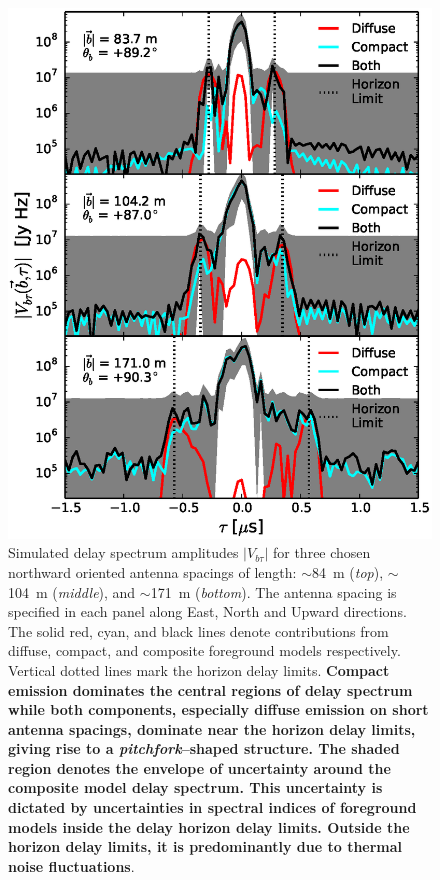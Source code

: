 \documentclass[preprint2,iop,numberedappendix]{emulateapj}
\begin{document}
\begin{figure}[htb]
\centering
\includegraphics[width=\linewidth]{f10.eps}
\caption{Simulated delay spectrum amplitudes $|V_{b\tau}|$ for three chosen northward oriented antenna spacings of length: $\sim$84~m ({\it top}), $\sim$104~m ({\it middle}), and $\sim$171~m ({\it bottom}). The antenna spacing is specified in each panel along East, North and Upward directions. The solid red, cyan, and black lines denote contributions from diffuse, compact, and composite foreground models respectively. Vertical dotted lines mark the horizon delay limits. {\bf Compact emission dominates the central regions of delay spectrum while both components, especially diffuse emission on short antenna spacings, dominate near the horizon delay limits, giving rise to a {\it pitchfork}--shaped structure. The shaded region denotes the envelope of uncertainty around the composite model delay spectrum. This uncertainty is dictated by uncertainties in spectral indices of foreground models inside the delay horizon delay limits. Outside the horizon delay limits, it is predominantly due to thermal noise fluctuations}. \label{fig:pitchfork-baselines}}
\end{figure}
\end{document}
